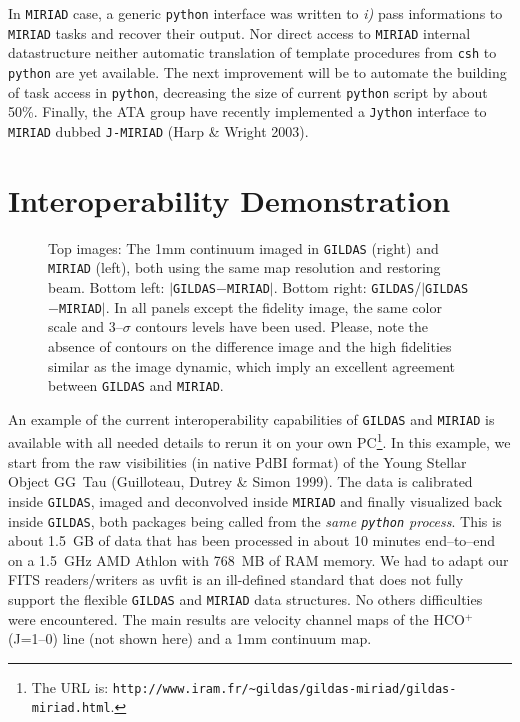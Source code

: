 \documentclass[11pt,twoside]{article}  %
\newcommand{\GILDAS}{\texttt{GILDAS}}
\newcommand{\MIRIAD}{\texttt{MIRIAD}}
\newcommand{\python}{\texttt{python}}
\newcommand{\PdBI}{\textrm{PdBI}}
\newcommand{\HCOp} {\mbox{HCO$^{+}$}} %
\newcommand{\Jone}{\mbox{(J=1--0)}}
\begin{document}
In \MIRIAD{} case, a generic \python{} interface was written to \emph{i)}
pass informations to \MIRIAD{} tasks and recover their output.  Nor direct
access to \MIRIAD{} internal datastructure neither automatic translation of
template procedures from \texttt{csh} to \python{} are yet available. The
next improvement will be to automate the building of task access in
\python{}, decreasing the size of current \python{} script by about 50\%.
Finally, the ATA group have recently implemented a \texttt{Jython}
interface to \MIRIAD{} dubbed \texttt{J-MIRIAD} (Harp \& Wright 2003).

\section{Interoperability Demonstration}

\begin{figure}[t]
  \caption{Top images: The 1mm continuum imaged in \GILDAS{} (right) and
    \MIRIAD{} (left), both using the same map resolution and restoring beam.
    Bottom left: $|$\GILDAS{}$-$\MIRIAD{}$|$. Bottom right:
    \GILDAS{}/$|$\GILDAS{}$-$\MIRIAD{}$|$. In all panels except the
    fidelity image, the same color scale and 3--$\sigma$ contours levels
    have been used. Please, note the absence of contours on the difference
    image and the high fidelities similar as the image dynamic, which imply
    an excellent agreement between \GILDAS{} and \MIRIAD{}.}
  \label{fig:P4-14_2}
\end{figure}

An example of the current interoperability capabilities of \GILDAS{} and
\MIRIAD{} is available with all needed details to rerun it on your own
PC\footnote{The URL is:
  \texttt{http://www.iram.fr/\~{}gildas/gildas-miriad/gildas-miriad.html}.}.
In this example, we start from the raw visibilities (in native \PdBI{}
format) of the Young Stellar Object GG~Tau (Guilloteau, Dutrey \& Simon
1999). The data is calibrated inside \GILDAS{}, imaged and deconvolved
inside \MIRIAD{} and finally visualized back inside \GILDAS{}, both
packages being called from the \emph{same \python{} process}. This is about
1.5~GB of data that has been processed in about 10 minutes end--to--end on
a 1.5~GHz AMD Athlon with 768~MB of RAM memory. We had to adapt our FITS
readers/writers as uvfit is an ill-defined standard that does not fully
support the flexible \GILDAS{} and \MIRIAD{} data structures. No others
difficulties were encountered. The main results are velocity channel maps
of the \HCOp{} \Jone{} line (not shown here) and a 1mm continuum map.
\end{document}
